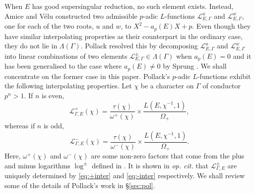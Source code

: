 \documentclass{amsart}
\begin{document}
When $E$ has good supersingular reduction, no such element exists. Instead, Amice and V{\'e}lu \cite{amicevelu75} constructed two admissible $p$-adic $L$-functions ${\mathcal{L}}_{E,\Gamma}^u$ and ${\mathcal{L}}_{E,\Gamma}^w$, one for each of the two roots, $u$ and $w$, to $X^2-a_p(E)X+p$. Even though they have similar interpolating properties as their counterpart in the ordinary case, they do not lie in $\Lambda(\Gamma)$. Pollack \cite{pollack03} resolved this  by decomposing ${\mathcal{L}}_{E,\Gamma}^u$ and ${\mathcal{L}}_{E,\Gamma}^w$ into linear combinations of two elements ${\mathcal{L}}^\pm_{E,\Gamma}\in\Lambda(\Gamma)$ when $a_p(E)=0$ and it has been generalised to the case where $a_p(E)\ne0$ by Sprung \cite{sprung09}. We shall concentrate on the former case in this paper. Pollack's $p$-adic $L$-functions exhibit the following interpolating properties. Let $\chi$ be a character on $\Gamma$ of conductor $p^n>1$. If $n$ is even,
\begin{equation}\label{eq:+inter}
{\mathcal{L}}_{\Gamma,E}^+(\chi)=\frac{\tau(\chi)}{\omega^+(\chi)}\times\frac{L(E,\chi^{-1},1)}{\Omega_+},
\end{equation}
whereas if $n$ is odd,
\begin{equation}\label{eq:-inter}
{\mathcal{L}}_{\Gamma,E}^-(\chi)=\frac{\tau(\chi)}{\omega^-(\chi)}\times\frac{L(E,\chi^{-1},1)}{\Omega_+}.
\end{equation}
Here, $\omega^+(\chi)$ and $\omega^-(\chi)$ are some non-zero factors that come from the plus and minus logarithms $\log^\pm$ defined in \cite{pollack03}. It is shown in {\it op. cit.} that ${\mathcal{L}}_{\Gamma,E}^\pm$ are uniquely determined by \eqref{eq:+inter} and \eqref{eq:-inter} respectively. We shall review some of the details of Pollack's work in \S\ref{sec:pol}.
\end{document}
